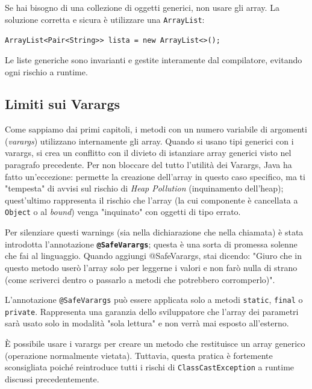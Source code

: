 \begin{bestpractice}
    Se hai bisogno di una collezione di oggetti generici, non usare gli array. La soluzione corretta e sicura è utilizzare una \texttt{ArrayList}:
    \begin{center}
        \texttt{ArrayList<Pair<String>> lista = new ArrayList<>();}
    \end{center}
    Le liste generiche sono invarianti e gestite interamente dal compilatore, evitando ogni rischio a runtime.
\end{bestpractice}

\subsection{Limiti sui Varargs}
Come sappiamo dai primi capitoli, i metodi con un numero variabile di argomenti (\textit{varargs}) utilizzano internamente gli array. Quando si usano tipi generici con i varargs, si crea un conflitto con il divieto di istanziare array generici visto nel paragrafo precedente. Per non bloccare del tutto l'utilità dei Varargs, Java ha fatto un'eccezione: permette la creazione dell'array in questo caso specifico, ma ti "tempesta" di avvisi sul rischio di \textit{Heap Pollution} (inquinamento dell'heap); quest'ultimo rappresenta il rischio che l'array (la cui componente è cancellata a \texttt{Object} o al \textit{bound}) venga "inquinato" con oggetti di tipo errato.

Per silenziare questi warnings (sia nella dichiarazione che nella chiamata) è stata introdotta l'annotazione \textbf{\texttt{@SafeVarargs}}; questa è una sorta di promessa solenne che fai al linguaggio. Quando aggiungi @SafeVarargs, stai dicendo:
"Giuro che in questo metodo userò l'array solo per leggerne i valori e non farò nulla di strano (come scriverci dentro o passarlo a metodi che potrebbero corromperlo)".

\begin{warningbox}[]
    L'annotazione \texttt{@SafeVarargs} può essere applicata solo a metodi \texttt{static}, \texttt{final} o \texttt{private}. Rappresenta una garanzia dello sviluppatore che l'array dei parametri sarà usato solo in modalità "sola lettura" e non verrà mai esposto all'esterno.
\end{warningbox}

\begin{warningbox}
    È possibile usare i varargs per creare un metodo che restituisce un array generico (operazione normalmente vietata). Tuttavia, questa pratica è fortemente sconsigliata poiché reintroduce tutti i rischi di \texttt{ClassCastException} a runtime discussi precedentemente.
\end{warningbox}

